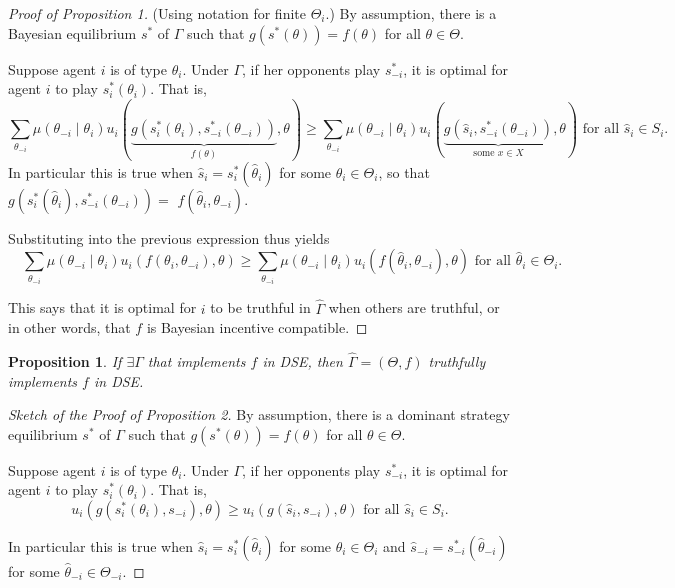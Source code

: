 \documentclass[11pt,leqno]{article}
\newtheorem{proposition}{Proposition}
\begin{document}
\begin{proof}[Proof of Proposition 1] (Using notation for finite $\Theta_i$.) By assumption, there is a Bayesian equilibrium $s^*$ of $\Gamma$ such that $g\left(s^*(\theta)\right)=f(\theta)$ for all $\theta \in \Theta$.

Suppose agent $i$ is of type $\theta_i$. Under $\Gamma$, if her opponents play $s_{-i}^*$, it is optimal for agent $i$ to play $s_i^*\left(\theta_i\right)$. That is,
$$
\sum_{\theta_{-i}} \mu\left(\theta_{-i} \mid \theta_i\right) u_i(\underbrace{g\left(s_i^*\left(\theta_i\right), s_{-i}^*\left(\theta_{-i}\right)\right)}_{f(\theta)}, \theta) \geq \sum_{\theta_{-i}} \mu\left(\theta_{-i} \mid \theta_i\right) u_i(\underbrace{g\left(\hat{s}_i, s_{-i}^*\left(\theta_{-i}\right)\right)}_{\text {some } x \in X}, \theta) \text { for all } \hat{s}_i \in S_i .
$$
In particular this is true when $\hat{s}_i=s_i^*\left(\hat{\theta}_i\right)$ for some $\hat{\theta}_i \in \Theta_i$, so that $g\left(s_i^*\left(\hat{\theta}_i\right), s_{-i}^*\left(\theta_{-i}\right)\right)=$ $f\left(\hat{\theta}_i, \theta_{-i}\right)$. 

Substituting into the previous expression thus yields
$$\quad \sum_{\theta_{-i}} \mu\left(\theta_{-i} \mid \theta_i\right) u_i\left(f\left(\theta_i, \theta_{-i}\right), \theta\right) \geq \sum_{\theta_{-i}} \mu\left(\theta_{-i} \mid \theta_i\right) u_i\left(f\left(\hat{\theta}_i, \theta_{-i}\right), \theta\right)\text { for all } \hat{\theta}_i \in \Theta_i.$$ 

This says that it is optimal for $i$ to be truthful in $\hat{\Gamma}$ when others are truthful, or in other words, that $f$ is Bayesian incentive compatible.
\end{proof}

\begin{proposition}
If $\exists \Gamma$ that implements $f$ in DSE, then $\hat{\Gamma}=(\Theta,f)$ truthfully implements $f$ in DSE.
\end{proposition}

\begin{proof}[Sketch of the Proof of Proposition 2] By assumption, there is a dominant strategy equilibrium $s^*$ of $\Gamma$ such that $g\left(s^*(\theta)\right)=f(\theta)$ for all $\theta \in \Theta$.

Suppose agent $i$ is of type $\theta_i$. Under $\Gamma$, if her opponents play $s_{-i}^*$, it is optimal for agent $i$ to play $s_i^*\left(\theta_i\right)$. That is,
$$
u_i(g\left(s_i^*\left(\theta_i\right), s_{-i}\right), \theta) \geq u_i(g\left(\hat{s}_i, s_{-i}\right), \theta) \text { for all } \hat{s}_i \in S_i .
$$

In particular this is true when $\hat{s}_i=s_i^*\left(\hat{\theta}_i\right)$ for some $\hat{\theta}_i \in \Theta_i$ and $\hat{s}_{-i}=s_{-i}^*\left(\hat{\theta}_{-i}\right)$ for some $\hat{\theta}_{-i} \in \Theta_{-i}$. 
\end{proof}
\end{document}
